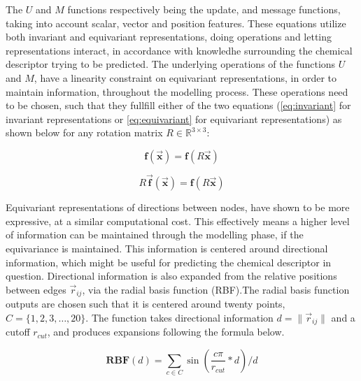 The $U$ and $M$ functions respectively being the update, and message functions, taking into account scalar, vector and
position features. These equations utilize both invariant and equivariant representations, doing operations and letting
representations interact, in accordance with knowledhe surrounding the chemical descriptor trying to be predicted. The underlying
operations of the functions $U$ and $M$, have a linearity constraint on equivariant representations, in order to maintain
information, throughout the modelling process\cite{Atz2021}. These operations need to be chosen, such that they fullfill either
of the two equations (\ref{eq:invariant} for invariant representations or \ref{eq:equivariant} for equivariant representations)
as shown below for any rotation matrix $R \in \mathbb{R}^{3 \times 3}$:

\begin{equation}\label{eq:invariant}
    \mathbf{f}(\vec{\mathbf{x}}) = \mathbf{f}(R \vec{\mathbf{x}})
\end{equation}

\begin{equation}\label{eq:equivariant}
    R \vec{\mathbf{f}}(\vec{\mathbf{x}}) = \mathbf{\mathbf{f}}(R \vec{\mathbf{x}})
\end{equation}


Equivariant representations of directions between nodes, have shown to be more expressive, at a similar computational cost.
This effectively means a higher level of information can be maintained through the modelling phase, if the equivariance is
maintained. This information is centered around directional information, which might be useful for predicting the chemical
descriptor in question. Directional information is also expanded from the relative positions between edges $\vec{r}_{ij}$,
via the radial basis function (RBF)\cite{Atz2021}.The radial basis function outputs are chosen such that it is centered around twenty
points, $ C = \{1, 2, 3, \ldots, 20\}$. The function takes directional information $d = \lVert \vec{r}_{ij} \rVert$ and a cutoff
$r_{cut}$, and produces expansions following the formula below.

\begin{equation}\label{eq:rbf}
    \mathbf{RBF}(d) = \sum_{c \in C}\sin \left( \frac{c \pi}{r_{cut}} * d  \right) / d
\end{equation}

